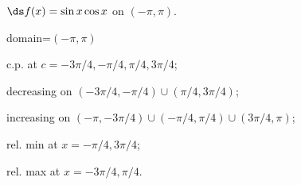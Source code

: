 {$\ds f(x) =\sin x\cos x$ on $(-\pi,\pi)$.
}
{domain=$(-\pi,\pi)$

c.p. at $c=-3\pi/4,-\pi/4,\pi/4,3\pi/4$; 

decreasing on $(-3\pi/4,-\pi/4) \cup (\pi/4,3\pi/4)$;

increasing on $(-\pi,-3\pi/4)\cup (-\pi/4,\pi/4) \cup (3\pi/4,\pi)$;

rel. min at $x=-\pi/4,3\pi/4$;

rel. max at $x=-3\pi/4,\pi/4$.
}
